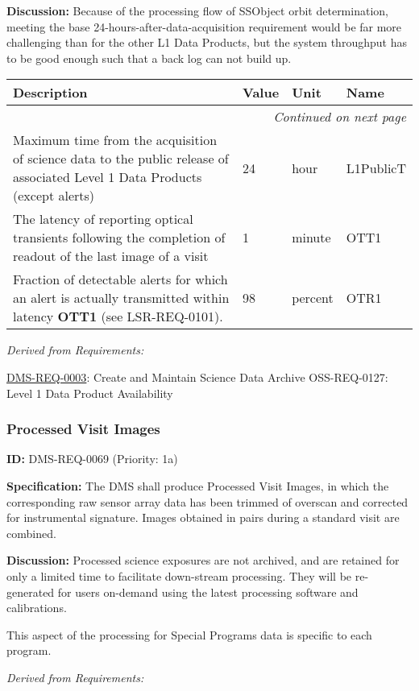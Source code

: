 \documentclass[SE,toc,lsstdraft]{lsstdoc}
\makeatletter
\newcommand{\paramname}[1]{\hspace{0pt}#1}
\newcommand{\unitname}[1]{\hspace{0pt}#1}
\newenvironment{parameters}[0]{%
\setlength\LTleft{0pt}
\setlength\LTright{\fill}
\begin{small}
\begin{longtable}[]{|p{0.49\textwidth}|l|p{0.6in}|p{1.70in}@{}|}

\hline \textbf{Description} & \textbf{Value} & \textbf{Unit} & \textbf{Name} \\ \hline
\endhead

\hline \multicolumn{4}{r}{\emph{Continued on next page}} \\
\endfoot

\hline\hline
\endlastfoot
}{%
\hline
\end{longtable}
\end{small}
}
\makeatother
\begin{document}
\textbf{Discussion:} Because of the processing flow of SSObject orbit determination, meeting the base 24-hours-after-data-acquisition requirement would be far more challenging than for the other L1 Data Products, but the system throughput has to be good enough such that a back log can not build up.

\begin{parameters}
Maximum time from the acquisition of science data to the public release of associated Level 1 Data Products (except alerts)
&
24
&
\unitname{%
hour
}
&
\paramname{%
L1PublicT
} \\\hline
The latency of reporting optical transients following the completion of readout of the last image of a visit
&
1
&
\unitname{%
minute
}
&
\paramname{%
OTT1
} \\\hline
Fraction of detectable alerts for which an alert is actually transmitted within latency \textbf{OTT1} (see LSR-REQ-0101).
&
98
&
\unitname{%
percent
}
&
\paramname{%
OTR1
} \\\hline
\end{parameters}

\emph{Derived from Requirements:}

\hyperref[DMS-REQ-0003]{DMS-REQ-0003}:
Create and Maintain Science Data Archive \newline
OSS-REQ-0127:
Level 1 Data Product Availability \newline

\subsubsection{Processed Visit Images}

\label{DMS-REQ-0069}
\textbf{ID:} DMS-REQ-0069 (Priority: 1a)

\textbf{Specification: }The DMS shall produce Processed Visit Images, in which the corresponding raw sensor array data has been trimmed of overscan and corrected for instrumental signature. Images obtained in pairs during a standard visit are combined.

\textbf{Discussion:} Processed science exposures are not archived, and are retained for only a limited time to facilitate down-stream processing. They will be re-generated for users on-demand using the latest processing software and calibrations.

This aspect of the processing for Special Programs data is specific to each program.

\emph{Derived from Requirements:}
\end{document}
